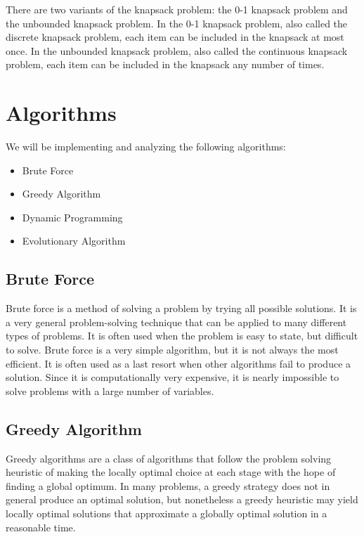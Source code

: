 \documentclass{article}
\begin{document}
There are two variants of the knapsack problem: the 0-1 knapsack problem and the unbounded knapsack problem. In the 0-1 knapsack problem, also called the discrete knapsack problem, each item can be included in the knapsack at most once. In the unbounded knapsack problem, also called the continuous knapsack problem, each item can be included in the knapsack any number of times.

\section*{Algorithms}
We will be implementing and analyzing the following algorithms:
\begin{itemize}
    \item Brute Force
    \item Greedy Algorithm
    \item Dynamic Programming
    \item Evolutionary Algorithm
\end{itemize}

\subsection*{Brute Force}
Brute force is a method of solving a problem by trying all possible solutions. It is a very general problem-solving technique that can be applied to many different types of problems. It is often used when the problem is easy to state, but difficult to solve. Brute force is a very simple algorithm, but it is not always the most efficient. It is often used as a last resort when other algorithms fail to produce a solution. Since it is computationally very expensive, it is nearly impossible to solve problems with a large number of variables. 

\subsection*{Greedy Algorithm}
Greedy algorithms are a class of algorithms that follow the problem solving heuristic of making the locally optimal choice at each stage with the hope of finding a global optimum. In many problems, a greedy strategy does not in general produce an optimal solution, but nonetheless a greedy heuristic may yield locally optimal solutions that approximate a globally optimal solution in a reasonable time.
\end{document}
